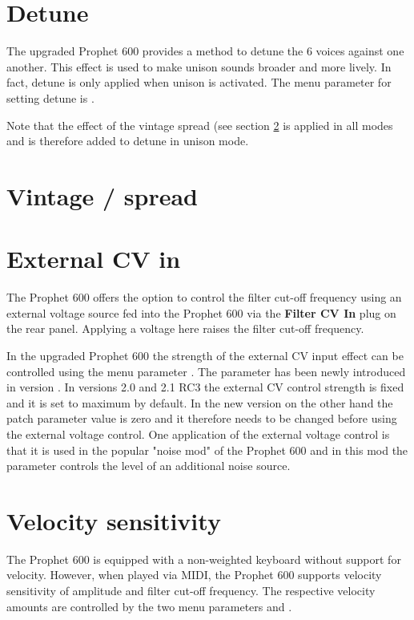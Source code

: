\documentclass[landscape, 11pt, oneside]{report}
\newenvironment{flowtext}{\addmargin[0cm]{7cm}}{\endaddmargin} %
\begin{document}
\begin{flowtext}
\section{Detune}\label{detune}

The upgraded Prophet 600 provides a method to detune the 6 voices against one another. This effect is used to make unison sounds broader and more lively. In fact, detune is only applied when unison is activated. The menu parameter for setting detune is \detune.

Note that the effect of the vintage spread (see section \ref{spreadsett} is applied in all modes and is therefore added to detune in unison mode. 

\section{Vintage / spread}\label{spreadsett}



\section{External CV in}\label{extcv}

The Prophet 600 offers the option to control the filter cut-off frequency using an external voltage source fed into the Prophet 600 via the \textbf{Filter CV In} plug on the rear panel. Applying a voltage here raises the filter cut-off frequency.

In the upgraded Prophet 600 the strength of the external CV input effect can be controlled using the menu parameter \extvolt. The parameter has been newly introduced in version \version. In versions 2.0 and 2.1 RC3 the external CV control strength is fixed and it is set to maximum by default. In the new version on the other hand the patch parameter value is zero and it therefore needs to be changed before using the external voltage control. One application of the external voltage control is that it is used in the popular "noise mod" of the Prophet 600 and in this mod the parameter controls the level of an additional noise source. 

\section{Velocity sensitivity}\label{velocity}

The Prophet 600 is equipped with a non-weighted keyboard without support for velocity. However, when played via MIDI, the Prophet 600 supports velocity sensitivity of amplitude and filter cut-off frequency. The respective velocity amounts are controlled by the two menu parameters \ampvel and \filvel.


\end{flowtext}
\end{document}

